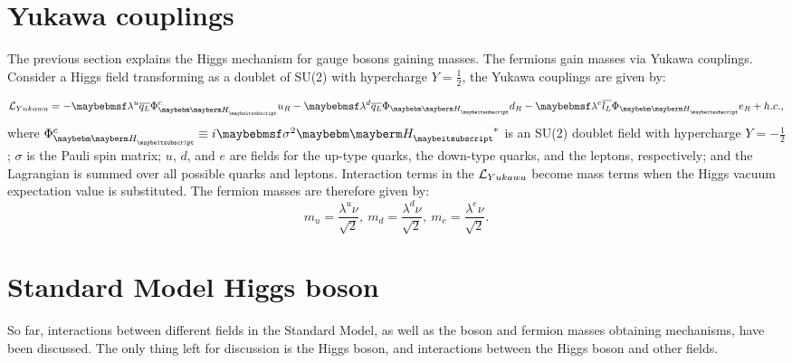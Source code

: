 \section{Yukawa couplings}

The previous section explains the Higgs mechanism for gauge bosons gaining masses. The fermions gain masses via Yukawa couplings. Consider a Higgs field transforming as a doublet of SU(2) with hypercharge $Y = \frac{1}{2}$, the Yukawa couplings are given by:

\begin{equation}
\Lagr_{Yukawa} = -\lambda^{u}\overline{q_L}\Phi_{\PH}^{c}u_R  - \lambda^{d}\overline{q_L}\Phi_{\PH}{d}_R - \lambda^{e}\overline{l_L}\Phi_{\PH}e_R + h.c. ,
\end{equation}
where $\Phi_{\PH}^{c} \equiv i \sigma^2{\PH}^*$ is an SU(2) doublet field with hypercharge $Y = -\frac{1}{2}$; $\sigma$ is the Pauli spin matrix; $u$, $d$, and $e$ are fields for the up-type quarks, the down-type quarks, and the leptons, respectively; and the Lagrangian is summed over all possible quarks and leptons. Interaction terms in the $\operatorname{\mathcal{L}}_{Yukawa}$ become mass terms when the Higgs vacuum expectation value is substituted. The fermion masses are therefore given by:
\begin{equation}
m_{u} = \frac{\lambda^u{\nu}}{\sqrt{2}},\ m_{d} = \frac{\lambda^d{\nu}}{\sqrt{2}},\ m_{e} = \frac{\lambda^e{\nu}}{\sqrt{2}}.
\end{equation}

\section{Standard Model Higgs boson}
\label{sec:theoryHiggsBoson}

So far, interactions between different fields in the Standard Model, as well as the boson and fermion masses obtaining mechanisms, have been discussed. The only thing left for discussion is the Higgs boson, and  interactions between the Higgs boson and other fields.

